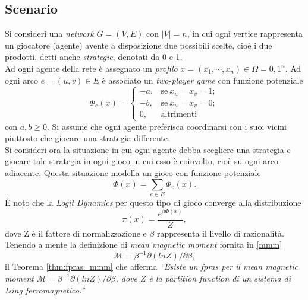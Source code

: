 \subsection{Scenario}
Si consideri una \textit{network} $G = (V,E)$ con $|V| = n$, in cui ogni vertice rappresenta un giocatore (agente) avente a disposizione due possibili scelte, cioè i due prodotti, detti anche \textit{strategie}, denotati da 0 e 1.\\
Ad ogni agente della rete è assegnato un \textit{profilo} $x = (x_1, \cdots, x_n) \in \Omega = {0, 1}^n$. Ad ogni arco $e = (u, v) \in E$ è associato un \textit{two-player game} con funzione potenziale 
\begin{equation}
\Phi_e(x) = 
\begin{cases}
-a, & \text{se}\ x_u = x_v = 1;\\
-b, & \text{se}\ x_u = x_v = 0;\\
0, & \text{altrimenti}
\end{cases}
\label{potentfun}
\end{equation}
con $a, b \geq 0$. Si assume che ogni agente preferisca coordinarsi con i suoi vicini piuttosto che giocare una strategia differente.\\
Si consideri ora la situazione in cui ogni agente debba scegliere una strategia e giocare tale strategia in ogni gioco in cui esso è coinvolto, cioè su ogni arco adiacente. Questa situazione modella un gioco con funzione potenziale
\begin{equation*}
	\Phi(x) = \sum_{e\in E}{\Phi_e(x)}.
	\label{eqpotfun}
\end{equation*}
È noto che la \textit{Logit Dynamics} per questo tipo di gioco converge alla distribuzione
\begin{equation*}
	\pi(x) = \frac{e^{\beta\Phi(x)}}{Z},
	\label{logitdistr}
\end{equation*}
dove Z è il fattore di normalizzazione e $\beta$ rappresenta il livello di razionalità.\\
Tenendo a mente la definizione di \textit{mean magnetic moment} fornita in \ref{mmm}
\begin{equation*}
\mathcal{M} = \beta^{-1}\partial(lnZ)/\partial\beta,
\end{equation*}
il Teorema \ref{thm:fpras_mmm} che afferma
\textit{ ``Esiste un fpras per il mean magnetic moment $\mathcal{M} = \beta^{-1}\partial(lnZ)/\partial\beta$, dove $Z$ è la partition function di un sistema di Ising ferromagnetico.''}

